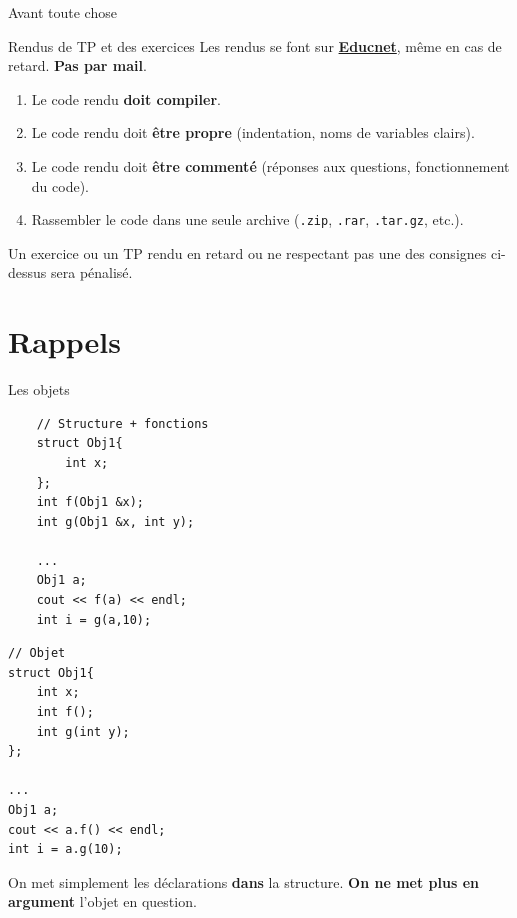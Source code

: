 
\author[nicolas.audebert@onera.fr]{Nicolas Audebert}
\date[24 nov. 2017]{Vendredi 24 novembre 2017}
\subtitle{Constructeurs - Destructeurs}
\maketitle

\begin{frame}{Avant toute chose}
  \begin{alertblock}{Rendus de TP et des exercices}
  Les rendus se font sur \href{https://educnet.enpc.fr}{\textbf{Educnet}}, même en cas de retard. \textbf{Pas par mail}.
  \begin{enumerate}
  	\item Le code rendu \textbf{doit compiler}.
    \item Le code rendu doit \textbf{être propre} (indentation, noms de variables clairs).
    \item Le code rendu doit \textbf{être commenté} (réponses aux questions, fonctionnement du code).
    \item Rassembler le code dans une seule archive (\texttt{.zip}, \texttt{.rar}, \texttt{.tar.gz}, etc.).
  \end{enumerate}
  Un exercice ou un TP rendu en retard ou ne respectant pas une des consignes ci-dessus sera pénalisé.
  \end{alertblock}
\end{frame}

\section{Rappels}

\begin{frame}[fragile=singleslide]{Les objets}
\begin{minipage}{0.48\linewidth}
    \begin{verbatim}
    // Structure + fonctions
    struct Obj1{
        int x;
    };
    int f(Obj1 &x);
    int g(Obj1 &x, int y);

    ...
    Obj1 a;
    cout << f(a) << endl;
    int i = g(a,10);
    \end{verbatim}
\end{minipage}
\hfill
\begin{minipage}{0.48\linewidth}
    
        \begin{verbatim}
// Objet
struct Obj1{
    int x;
    int f();
    int g(int y);
};

...
Obj1 a;
cout << a.f() << endl;
int i = a.g(10);
        \end{verbatim}
    
\end{minipage}

\vspace{0.3cm}
On met simplement les déclarations \textbf{dans} la structure.
\textbf{On ne met plus en argument} l'objet en question.
\end{frame}

